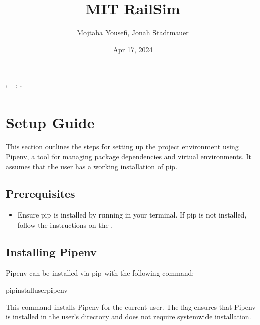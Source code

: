 \documentclass[letterpaper,10pt,english]{sphinxmanual}
\title{MIT RailSim}
\date{Apr 17, 2024}
\author{Mojtaba Yousefi, Jonah Stadtmauer}
\begin{document}
\ifdefined\shorthandoff
  \ifnum\catcode`\=\string=\active\shorthandoff{=}\fi
  \ifnum\catcode`\"=\active{}\fi
\fi

\pagestyle{empty}
\sphinxmaketitle
\pagestyle{plain}
\sphinxtableofcontents
\pagestyle{normal}
\label{\detokenize{index::doc}}


\sphinxstepscope


\chapter{Setup Guide}
\label{\detokenize{setup_guide:setup-guide}}\label{\detokenize{setup_guide::doc}}
\sphinxAtStartPar
This section outlines the steps for setting up the project environment using Pipenv, a tool for managing package dependencies and virtual environments. It assumes that the user has a working installation of pip.


\section{Prerequisites}
\label{\detokenize{setup_guide:prerequisites}}\begin{itemize}
\item {} 
\sphinxAtStartPar
Ensure pip is installed by running  in your terminal. If pip is not installed, follow the instructions on the .

\end{itemize}


\section{Installing Pipenv}
\label{\detokenize{setup_guide:installing-pipenv}}
\sphinxAtStartPar
Pipenv can be installed via pip with the following command:

\begin{sphinxVerbatim}[commandchars=\\\{\}]
pipinstall\PYGZhy{}\PYGZhy{}userpipenv
\end{sphinxVerbatim}

\sphinxAtStartPar
This command installs Pipenv for the current user. The  flag ensures that Pipenv is installed in the user’s directory and does not require system\sphinxhyphen{}wide installation.
\end{document}
